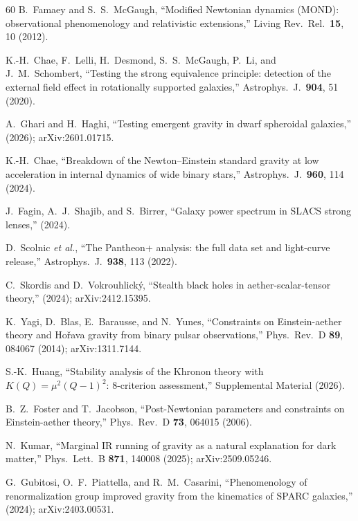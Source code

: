\documentclass[prd,twocolumn,superscriptaddress,longbibliography,floatfix]{revtex4-2}
\begin{document}
\begin{thebibliography}{60}
B.~Famaey and S.~S.~McGaugh,
``Modified Newtonian dynamics (MOND): observational phenomenology
and relativistic extensions,''
Living Rev.\ Rel.\ \textbf{15}, 10 (2012).

K.-H.~Chae, F.~Lelli, H.~Desmond, S.~S.~McGaugh,
P.~Li, and J.~M.~Schombert,
``Testing the strong equivalence principle: detection of the
external field effect in rotationally supported galaxies,''
Astrophys.\ J.\ \textbf{904}, 51 (2020).

A.~Ghari and H.~Haghi,
``Testing emergent gravity in dwarf spheroidal galaxies,''
(2026); arXiv:2601.01715.

K.-H.~Chae,
``Breakdown of the Newton--Einstein standard gravity at low
acceleration in internal dynamics of wide binary stars,''
Astrophys.\ J.\ \textbf{960}, 114 (2024).

J.~Fagin, A.~J.~Shajib, and S.~Birrer,
``Galaxy power spectrum in SLACS strong lenses,''
(2024).

D.~Scolnic \emph{et al.},
``The Pantheon+ analysis: the full data set and light-curve
release,''
Astrophys.\ J.\ \textbf{938}, 113 (2022).

C.~Skordis and D.~Vokrouhlick\'{y},
``Stealth black holes in aether-scalar-tensor theory,''
(2024); arXiv:2412.15395.

K.~Yagi, D.~Blas, E.~Barausse, and N.~Yunes,
``Constraints on Einstein-aether theory and Ho\v{r}ava
gravity from binary pulsar observations,''
Phys.\ Rev.\ D \textbf{89}, 084067 (2014);
arXiv:1311.7144.

S.-K.~Huang,
``Stability analysis of the Khronon theory with
$K(Q) = \mu^2(Q-1)^2$: 8-criterion assessment,''
Supplemental Material (2026).

B.~Z.~Foster and T.~Jacobson,
``Post-Newtonian parameters and constraints on Einstein-aether
theory,''
Phys.\ Rev.\ D \textbf{73}, 064015 (2006).

N.~Kumar,
``Marginal IR running of gravity as a natural explanation for
dark matter,''
Phys.\ Lett.\ B \textbf{871}, 140008 (2025);
arXiv:2509.05246.

G.~Gubitosi, O.~F.~Piattella, and R.~M.~Casarini,
``Phenomenology of renormalization group improved gravity from
the kinematics of SPARC galaxies,''
(2024); arXiv:2403.00531.


\end{thebibliography}
\end{document}
